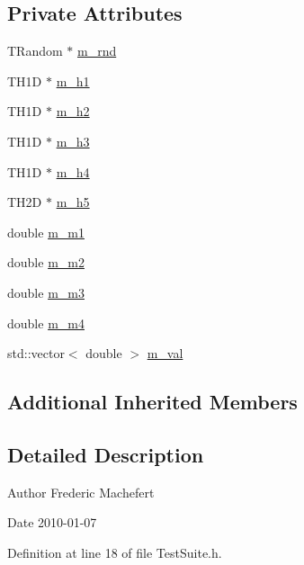 \subsection*{Private Attributes}
\begin{DoxyCompactItemize}
\item 
T\+Random $\ast$ \hyperlink{classTestSuite_a8288c9104c87bfc3934e2b6bffdef66f}{m\+\_\+rnd}
\item 
T\+H1D $\ast$ \hyperlink{classTestSuite_a8691ed6da0262d0e09d512b58375f94c}{m\+\_\+h1}
\item 
T\+H1D $\ast$ \hyperlink{classTestSuite_ad08c4828466d73e1273408ecd3547baf}{m\+\_\+h2}
\item 
T\+H1D $\ast$ \hyperlink{classTestSuite_a86ca996cbb37caad3bcc32a138737e27}{m\+\_\+h3}
\item 
T\+H1D $\ast$ \hyperlink{classTestSuite_a86739625b47a8ce6ebe2d7fb9f5128e3}{m\+\_\+h4}
\item 
T\+H2D $\ast$ \hyperlink{classTestSuite_a384f4680f040072ec87b872bb4778ed6}{m\+\_\+h5}
\item 
double \hyperlink{classTestSuite_a853a92fd3e82371d19993739c2bf1236}{m\+\_\+m1}
\item 
double \hyperlink{classTestSuite_a710aa6029d3d0b47b61a828a472f7546}{m\+\_\+m2}
\item 
double \hyperlink{classTestSuite_acbc062956d67a5f47dfb74286a390300}{m\+\_\+m3}
\item 
double \hyperlink{classTestSuite_ac3d39b72dd5fce4c48eb39ea56be3e36}{m\+\_\+m4}
\item 
std\+::vector$<$ double $>$ \hyperlink{classTestSuite_affc1803c853fb7633bc59aa89d217fcf}{m\+\_\+val}
\end{DoxyCompactItemize}
\subsection*{Additional Inherited Members}


\subsection{Detailed Description}
\begin{DoxyAuthor}{Author}
Frederic Machefert 
\end{DoxyAuthor}
\begin{DoxyDate}{Date}
2010-\/01-\/07 
\end{DoxyDate}


Definition at line 18 of file Test\+Suite.\+h.



